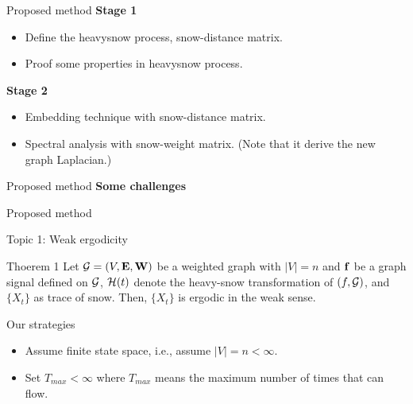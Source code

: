 \documentclass[
  ignorenonframetext,
]{beamer}
\providecommand{\tightlist}{%
  \setlength{\itemsep}{0pt}\setlength{\parskip}{0pt}}\usepackage{longtable,booktabs,array}
\begin{document}
\begin{frame}{Proposed method}
\label{proposed-method}
\textbf{Stage 1}

\begin{itemize}
\tightlist
\item
  Define the heavysnow process, snow-distance matrix.
\item
  Proof some properties in heavysnow process.
\end{itemize}

\textbf{Stage 2}

\begin{itemize}
\tightlist
\item
  Embedding technique with snow-distance matrix.
\item
  Spectral analysis with snow-weight matrix. (Note that it derive the
  new graph Laplacian.)
\end{itemize}
\end{frame}

\begin{frame}{Proposed method}
\label{proposed-method-1}
\textbf{Some challenges}

\end{frame}

\begin{frame}{Proposed method}
\label{proposed-method-2}
\begin{block}{Topic 1: Weak ergodicity}
\label{topic-1-weak-ergodicity}
\begin{block}{Thoerem 1}
\label{thoerem-1}
Let \({\cal G}=(V,{\bf E},{\bf W})\) be a weighted graph with \(|V|=n\)
and \({\bf f}\) be a graph signal defined on \({\cal G}\),
\({\cal H}(t)\) denote the heavy-snow transformation of
\((f,{\cal G})\), and \(\{X_t\}\) as trace of snow. Then, \(\{X_t\}\) is
ergodic in the weak sense.
\end{block}

\begin{block}{Our strategies}
\label{our-strategies}
\begin{itemize}
\tightlist
\item
  Assume finite state space, i.e., assume \(|V|=n <\infty\).
\item
  Set \(T_{max} < \infty\) where \(T_{max}\) means the maximum number of
  times that can flow.
\end{itemize}
\end{block}
\end{block}
\end{frame}
\end{document}
